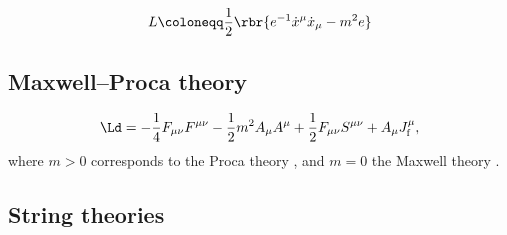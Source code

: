 \documentclass[a4paper,11pt]{article}
\begin{document}
\cite[sec.\ 2.1]{Blumenhagen2013}
\begin{equation}
L \coloneqq \frac{1}{2} \rbr{e^{-1}\dot{x}^\mu \dot{x}_\mu - m^2 e}
\label{eq:point-aux-lagrangian}
\end{equation}


\subsection{Maxwell--Proca theory}

\begin{equation}
\Ld = -\frac{1}{4} F_{\mu\nu} F^{\mu\nu} - \frac{1}{2}m^2 A_\mu A^\mu + 
\frac{1}{2} F_{\mu\nu} S^{\mu\nu} + A_\mu J^\mu_\text{f},
\end{equation}
where $m > 0$ corresponds to the Proca theory \cite[sec.\ 2.3]{Gitman1990}, and 
$m = 0$ the Maxwell theory \cite[sec.\ 3.3.3]{Rothe2010} \cite[sec.\ 
2.4]{Gitman1990}.






\subsection{String theories}
\end{document}
